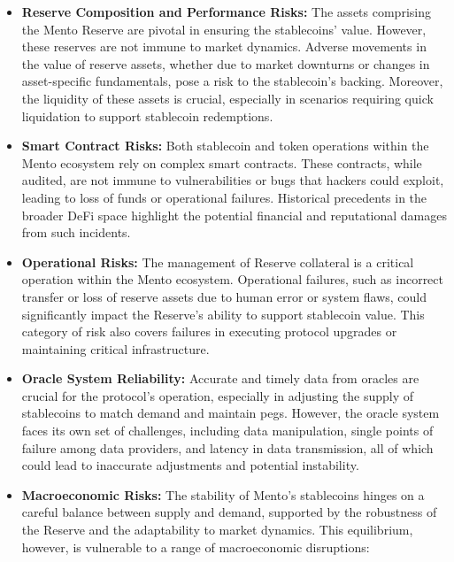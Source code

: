 \documentclass[a4paper]{article}
\theoremstyle{definition}
\begin{document}
\begin{itemize}
    
    \item \textbf{Reserve Composition and Performance Risks:} The assets comprising the Mento Reserve are pivotal in ensuring the stablecoins' value. However, these reserves are not immune to market dynamics. Adverse movements in the value of reserve assets, whether due to market downturns or changes in asset-specific fundamentals, pose a risk to the stablecoin's backing. Moreover, the liquidity of these assets is crucial, especially in scenarios requiring quick liquidation to support stablecoin redemptions.

    \item \textbf{Smart Contract Risks:} Both stablecoin and token operations within the Mento ecosystem rely on complex smart contracts. These contracts, while audited, are not immune to vulnerabilities or bugs that hackers could exploit, leading to loss of funds or operational failures. Historical precedents in the broader DeFi space highlight the potential financial and reputational damages from such incidents.
    
    \item \textbf{Operational Risks:} The management of Reserve collateral is a critical operation within the Mento ecosystem. Operational failures, such as incorrect transfer or loss of reserve assets due to human error or system flaws, could significantly impact the Reserve's ability to support stablecoin value. This category of risk also covers failures in executing protocol upgrades or maintaining critical infrastructure.

    \item \textbf{Oracle System Reliability:} Accurate and timely data from oracles are crucial for the protocol's operation, especially in adjusting the supply of stablecoins to match demand and maintain pegs. However, the oracle system faces its own set of challenges, including data manipulation, single points of failure among data providers, and latency in data transmission, all of which could lead to inaccurate adjustments and potential instability.

    \item \textbf{Macroeconomic Risks:} 
    The stability of Mento's stablecoins hinges on a careful balance between supply and demand, supported by the robustness of the Reserve and the adaptability to market dynamics. This equilibrium, however, is vulnerable to a range of macroeconomic disruptions:
    

\end{itemize}
\end{document}
